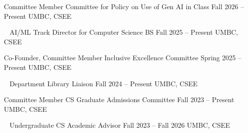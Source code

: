 \begin{cventries}

\cventry
    {Committee Member}
    {Committee for Policy on Use of Gen AI in Class}
    {Fall 2026 -- Present}
    {UMBC, CSEE}
    {}


    
\cventry
    {~}
    {AI/ML Track Director for Computer Science BS}
    {Fall 2025 -- Present}
    {UMBC, CSEE}
    {}
    
\cventry
    {Co-Founder, Committee Member}
    {Inclusive Excellence Committee}
    {Spring 2025 -- Present}
    {UMBC, CSEE}
    {}
    
\cventry
    {~}
    {Department Library Liaison}
    {Fall 2024 -- Present}
    {UMBC, CSEE}
    {} 
    
\cventry
    {Committee Member}
    {CS Graduate Admissions Committee}
    {Fall 2023 -- Present}
    {UMBC, CSEE}
    {} 
    
\cventry
    {~}
    {Undergraduate CS Academic Advisor}
    {Fall 2023 -- Fall 2026}%
    {UMBC, CSEE}
    {}  
    
\end{cventries}